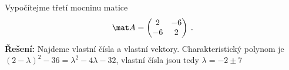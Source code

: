\begin{example}
    Vypočítejme třetí mocninu matice \begin{align}
        \mat A = \begin{pmatrix}
            2 & -6 \\ -6 & 2
        \end{pmatrix} \:.
    \end{align}
    \textbf{Řešení:} Najdeme vlastní čísla a vlastní vektory. Charakteristický polynom je $(2 - \lambda)^2 - 36 = \lambda^2 - 4 \lambda - 32$, vlastní čísla jsou tedy $\lambda = -2 \pm 7$ 
\end{example}